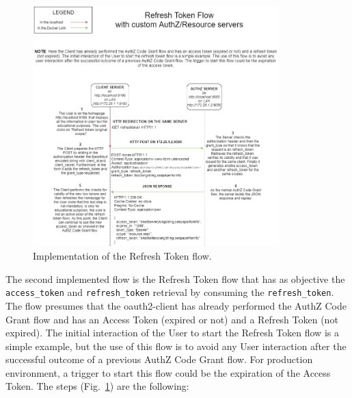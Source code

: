 \documentclass[a4paper,12pt]{article}
\def\myfig#1{Fig.~#1\xspace}
\begin{document}
\begin{figure}[ht]
    \centering
    \includegraphics[width=0.85\textwidth]{figures/flow_refresh1.png}
    \caption{Implementation of the Refresh Token flow.}
    \label{fig:refresh1}
\end{figure}

The second implemented flow is the Refresh Token flow that has as objective the \texttt{access\_token} and \texttt{refresh\_token} retrieval by consuming the \texttt{refresh\_token}. The flow presumes that the oauth2-client has already performed the AuthZ Code Grant flow and has an Access Token (expired or not) and a Refresh Token (not expired). The initial interaction of the User to start the Refresh Token flow is a simple example, but the use of this flow is to avoid any User interaction after the successful outcome of a previous AuthZ Code Grant flow. For production environment, a trigger to start this flow could be the expiration of the Access Token. The steps (\myfig{\ref{fig:refresh1}}) are the following:
\end{document}
